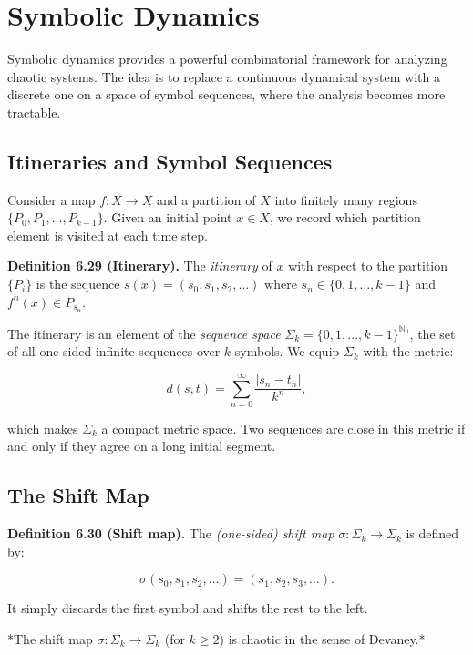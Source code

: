 \bigskip


\section{Symbolic Dynamics}\label{sec:6.6}

Symbolic dynamics provides a powerful combinatorial framework for analyzing chaotic systems. The idea is to replace a continuous dynamical system with a discrete one on a space of symbol sequences, where the analysis becomes more tractable.

\subsection{Itineraries and Symbol Sequences}\label{sec:6.6.1}

Consider a map $f: X \to X$ and a partition of $X$ into finitely many regions $\{P_0, P_1, \ldots, P_{k-1}\}$. Given an initial point $x \in X$, we record which partition element is visited at each time step.

\textbf{Definition 6.29 (Itinerary).} The \textit{itinerary} of $x$ with respect to the partition $\{P_i\}$ is the sequence $s(x) = (s_0, s_1, s_2, \ldots)$ where $s_n \in \{0, 1, \ldots, k-1\}$ and $f^n(x) \in P_{s_n}$.

The itinerary is an element of the \textit{sequence space} $\Sigma_k = \{0, 1, \ldots, k-1\}^{\mathbb{N}_0}$, the set of all one-sided infinite sequences over $k$ symbols. We equip $\Sigma_k$ with the metric:

\[
d(s, t) = \sum_{n=0}^{\infty} \frac{|s_n - t_n|}{k^n},
\]

which makes $\Sigma_k$ a compact metric space. Two sequences are close in this metric if and only if they agree on a long initial segment.

\subsection{The Shift Map}\label{sec:6.6.2}

\textbf{Definition 6.30 (Shift map).} The \textit{(one-sided) shift map} $\sigma: \Sigma_k \to \Sigma_k$ is defined by:

\[
\sigma(s_0, s_1, s_2, \ldots) = (s_1, s_2, s_3, \ldots).
\]

It simply discards the first symbol and shifts the rest to the left.

\begin{proposition}\label{prop:6.31.}
*The shift map $\sigma: \Sigma_k \to \Sigma_k$ (for $k \geq 2$) is chaotic in the sense of Devaney.*
\end{proposition}


